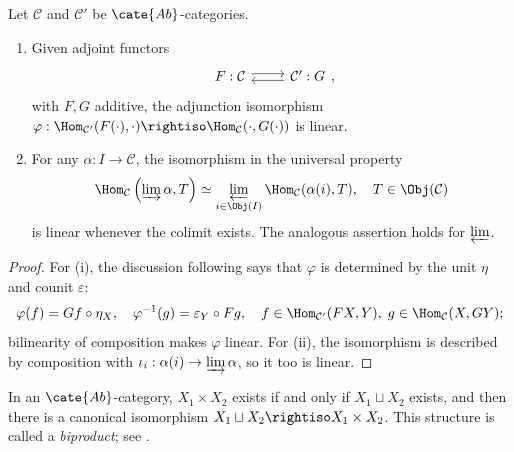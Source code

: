 \begin{proposition}\label{prop:automatic-Ab-morphism}
	Let $\mathcal C$ and $\mathcal C'$ be $\cate{Ab}$-categories.
	\begin{enumerate}
		\item Given adjoint functors
		\[\begin{tikzcd}
			F: \mathcal{C} \arrow[shift left, r] & \mathcal{C}' \arrow[shift left, l] : G
		\end{tikzcd},\]
		with $F,G$ additive, the adjunction isomorphism $\varphi:\Hom_{\mathcal C'}(F(\cdot),\cdot)\rightiso\Hom_{\mathcal C}(\cdot,G(\cdot))$ is linear.
		\item For any $\alpha:I\to\mathcal C$, the isomorphism in the universal property
		\[ \Hom_{\mathcal{C}}\left( \varinjlim \alpha, T \right) \simeq
		\varprojlim_{i \in \Obj(I)} \Hom_{\mathcal{C}}(\alpha(i), T),
		\quad T \in \Obj(\mathcal{C}) \]
		is linear whenever the colimit exists. The analogous assertion holds for $\varprojlim$.
	\end{enumerate}
\end{proposition}

\begin{proof}
	For (i), the discussion following \cite[Definition~2.6.3]{Li1} says that $\varphi$ is determined by the unit $\eta$ and counit $\varepsilon$:
	\[ \varphi(f) = Gf \circ \eta_X, \quad
	\varphi^{-1}(g) = \varepsilon_Y \circ Fg, \quad
	f \in \Hom_{\mathcal{C}'}(FX, Y), \; g \in \Hom_{\mathcal{C}}(X, GY); \]
	bilinearity of composition makes $\varphi$ linear. For (ii), the isomorphism is described by composition with $\iota_i:\alpha(i)\to\varinjlim\alpha$, so it too is linear.
\end{proof}

In an $\cate{Ab}$-category, $X_1\times X_2$ exists if and only if $X_1\sqcup X_2$ exists, and then there is a canonical isomorphism $X_1\sqcup X_2\rightiso X_1\times X_2$. This structure is called a \emph{biproduct}; see \cite[Definition~3.4.8, Theorem~3.4.9]{Li1}.

